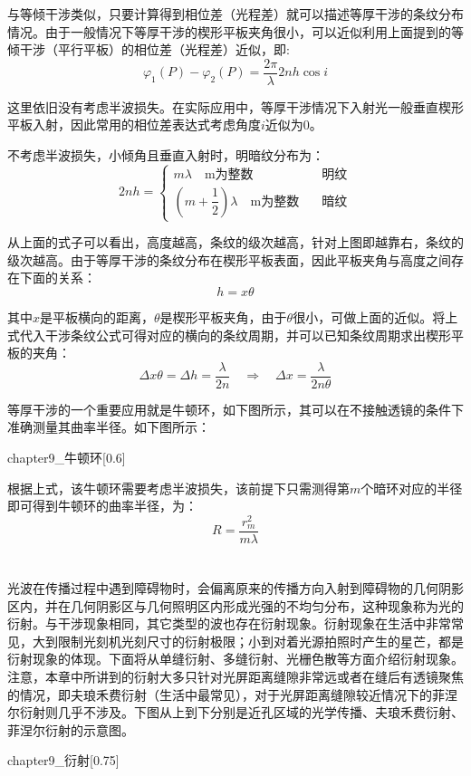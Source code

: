 与等倾干涉类似，只要计算得到相位差（光程差）就可以描述等厚干涉的条纹分布情况。由于一般情况下等厚干涉的楔形平板夹角很小，可以近似利用上面提到的等倾干涉（平行平板）的相位差（光程差）近似，即:
\[\varphi_1(P) - \varphi_2(P) = \dfrac{2\pi}{\lambda}2nh\cos i\]

这里依旧没有考虑半波损失。在实际应用中，等厚干涉情况下入射光一般垂直楔形平板入射，因此常用的相位差表达式考虑角度$i$近似为0。
\begin{law}
    不考虑半波损失，小倾角且垂直入射时，明暗纹分布为：
    \[2nh = \begin{cases}
        m\lambda \quad \text{m为整数} & \text{明纹}\\
        (m+\dfrac{1}{2})\lambda \quad \text{m为整数} \quad & \text{暗纹}
    \end{cases}\]
\end{law}

从上面的式子可以看出，高度越高，条纹的级次越高，针对上图即越靠右，条纹的级次越高。由于等厚干涉的条纹分布在楔形平板表面，因此平板夹角与高度之间存在下面的关系：
\[h = x\theta\]

其中$x$是平板横向的距离，$\theta$是楔形平板夹角，由于$\theta$很小，可做上面的近似。将上式代入干涉条纹公式可得对应的横向的条纹周期，并可以已知条纹周期求出楔形平板的夹角：
\[\Delta x\theta = \Delta h = \dfrac{\lambda}{2n}\quad\Rightarrow\quad \Delta x = \dfrac{\lambda}{2n\theta}\]

等厚干涉的一个重要应用就是牛顿环，如下图所示，其可以在不接触透镜的条件下准确测量其曲率半径。如下图所示：
\begin{singlefigure}[牛顿环]{chapter9_牛顿环}[0.6]
\end{singlefigure}

\begin{law}
    根据上式，该牛顿环需要考虑半波损失，该前提下只需测得第$m$个暗环对应的半径即可得到牛顿环的曲率半径，为：
    \[R = \dfrac{r_m^2}{m\lambda}\]
\end{law}

\section[衍射]{}
光波在传播过程中遇到障碍物时，会偏离原来的传播方向入射到障碍物的几何阴影区内，并在几何阴影区与几何照明区内形成光强的不均匀分布，这种现象称为光的衍射。与干涉现象相同，其它类型的波也存在衍射现象。衍射现象在生活中非常常见，大到限制光刻机光刻尺寸的衍射极限；小到对着光源拍照时产生的星芒，都是衍射现象的体现。下面将从单缝衍射、多缝衍射、光栅色散等方面介绍衍射现象。注意，本章中所讲到的衍射大多只针对光屏距离缝隙非常远或者在缝后有透镜聚焦的情况，即夫琅禾费衍射（生活中最常见），对于光屏距离缝隙较近情况下的菲涅尔衍射则几乎不涉及。下图从上到下分别是近孔区域的光学传播、夫琅禾费衍射、菲涅尔衍射的示意图。
\begin{singlefigure}[衍射]{chapter9_衍射}[0.75]
\end{singlefigure}

